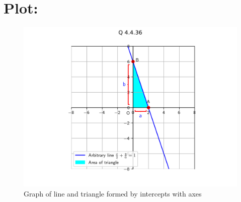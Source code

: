 \documentclass[a4paper, 12pt]{article}
\begin{document}
\section{Plot: }
\begin{figure}[h!]
    \centering
    \includegraphics[width=\columnwidth]{figs/plot.png}
    \caption{Graph of line and triangle formed by intercepts with axes}
    \label{fig:4.4.36}
\end{figure}
\end{document}
